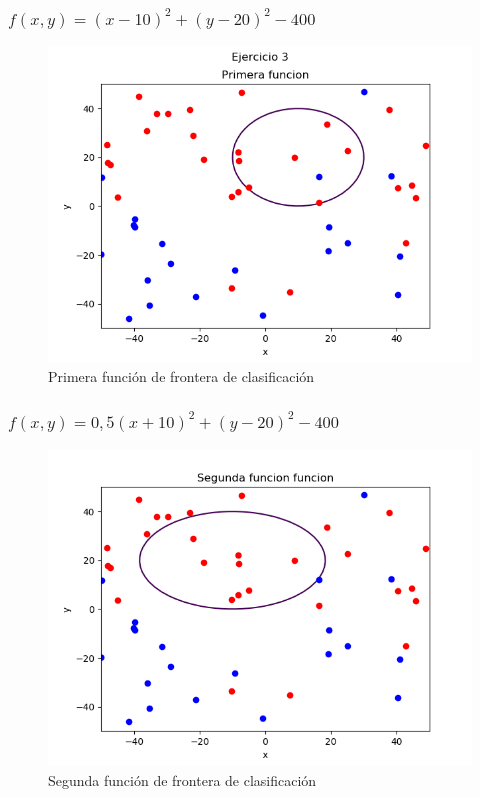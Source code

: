 \documentclass[12pt,a4paper]{article}
\begin{document}
\subsubsection{$f(x, y)=(x-10)^{2}+(y-20)^{2}-400$}
\begin{figure}[H]  %
	\centering
	\includegraphics{images/primeraFuncion.png}  
	\caption{Primera función de frontera de clasificación}
	\label{figura5}
\end{figure}
\subsubsection{$f(x, y)=0,5(x+10)^{2}+(y-20)^{2}-400$}
\begin{figure}[H]  %
	\centering
	\includegraphics{images/segundafuncion.png}  
	\caption{Segunda función de frontera de clasificación}
	\label{figura6}
\end{figure}
\end{document}
